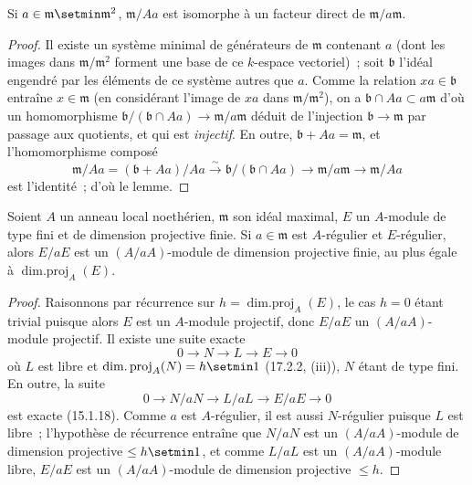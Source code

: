 \begin{lemma}[17.3.1.3]
\label{0.17.3.1.3-fr}
Si $a\in\mathfrak{m}\setmin\mathfrak{m}^2$, $\mathfrak{m}/Aa$ est isomorphe à un
facteur direct de $\mathfrak{m}/a\mathfrak{m}$.
\end{lemma}

\begin{proof}
Il existe un système minimal de générateurs de $\mathfrak{m}$ contenant $a$
(dont les images dans $\mathfrak{m}/\mathfrak{m}^2$ forment une base de ce
$k$-espace vectoriel)~; soit $\mathfrak{b}$ l'idéal engendré par les éléments
de ce système autres que $a$. Comme la relation $xa\in\mathfrak{b}$ entraîne
$x\in\mathfrak{m}$ (en considérant l'image de $xa$ dans
$\mathfrak{m}/\mathfrak{m}^2$), on a
$\mathfrak{b}\cap Aa\subset a\mathfrak{m}$ d'où un homomorphisme
$\mathfrak{b}/(\mathfrak{b}\cap Aa)\longrightarrow
\mathfrak{m}/a\mathfrak{m}$ déduit de l'injection
$\mathfrak{b}\longrightarrow\mathfrak{m}$ par passage aux quotients, et qui
est \emph{injectif}. En outre, $\mathfrak{b}+Aa=\mathfrak{m}$, et
l'homomorphisme composé
\[
  \mathfrak{m}/Aa=(\mathfrak{b}+Aa)/Aa
  \xrightarrow{\sim}\mathfrak{b}/(\mathfrak{b}\cap Aa)
  \longrightarrow\mathfrak{m}/a\mathfrak{m}
  \longrightarrow\mathfrak{m}/Aa
\]
est l'identité~; d'où le lemme.
\end{proof}

\begin{lemma}[17.3.1.4]
\label{0.17.3.1.4-fr}
Soient $A$ un anneau local noethérien, $\mathfrak{m}$ son idéal maximal, $E$
un $A$-module de type fini et de dimension projective finie. Si
$a\in\mathfrak{m}$ est $A$-régulier et $E$-régulier, alors $E/aE$ est un
$(A/aA)$-module de dimension projective finie, au plus égale à
$\operatorname{dim.proj}_A(E)$.
\end{lemma}

\begin{proof}
Raisonnons par récurrence sur $h=\operatorname{dim.proj}_A(E)$, le cas $h=0$
étant trivial puisque alors $E$ est un $A$-module projectif, donc $E/aE$ un
$(A/aA)$-module projectif. Il existe une suite exacte
\[
  0\longrightarrow N\longrightarrow L\longrightarrow E\longrightarrow0
\]
où $L$ est libre et $\operatorname{dim.proj}_A(N)=h\setmin 1$ (17.2.2, (iii)), $N$
étant de type fini. En outre, la suite
\[
  0\longrightarrow N/aN\longrightarrow L/aL\longrightarrow E/aE
  \longrightarrow0
\]
est exacte (15.1.18). Comme $a$ est $A$-régulier, il est aussi $N$-régulier
puisque $L$ est libre~; l'hypothèse de récurrence entraîne que $N/aN$ est un
$(A/aA)$-module de dimension projective $\leq h\setmin 1$, et comme $L/aL$ est un
$(A/aA)$-module libre, $E/aE$ est un $(A/aA)$-module de dimension projective
$\leq h$.
\end{proof}

